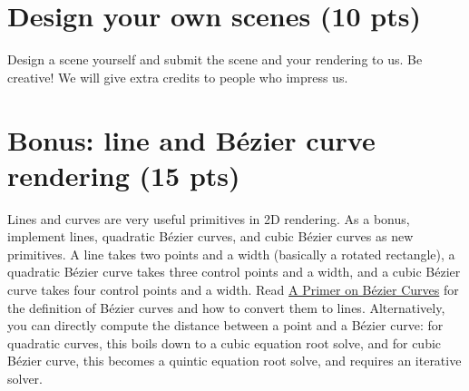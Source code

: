 \section{Design your own scenes (10 pts)}

Design a scene yourself and submit the scene and your rendering to us. Be creative! We will give extra credits to people who impress us.

\section{Bonus: line and B\'ezier curve rendering (15 pts)}

Lines and curves are very useful primitives in 2D rendering. As a bonus, implement lines, quadratic B\'ezier curves, and cubic B\'ezier curves as new primitives. A line takes two points and a width (basically a rotated rectangle), a quadratic B\'ezier curve takes three control points and a width, and a cubic B\'ezier curve takes four control points and a width. Read \href{https://pomax.github.io/bezierinfo/#flattening}{A Primer on B\'ezier Curves} for the definition of B\'ezier curves and how to convert them to lines. Alternatively, you can directly compute the distance between a point and a B\'ezier curve: for quadratic curves, this boils down to a cubic equation root solve, and for cubic B\'ezier curve, this becomes a quintic equation root solve, and requires an iterative solver.

%
%


